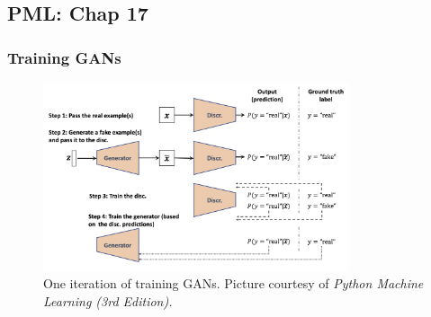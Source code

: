\documentclass{beamer}
\begin{document}
\subsection{PML: Chap 17}
\begin{frame}
\setlength{\leftmargini}{0.3cm}
\setlength{\leftmarginii}{0.6cm}
\setlength{\leftmarginiii}{0.9cm}
\frametitle{Training GANs}
\begin{figure}[h!]
\centering
\includegraphics[width=0.8\textwidth]{./figure/training_gan}
\caption{\footnotesize{One iteration of training GANs. Picture courtesy of \emph{Python Machine Learning (3rd Edition).}}}
\label{fig:training_gan}
\end{figure}
\end{frame}
\end{document}
